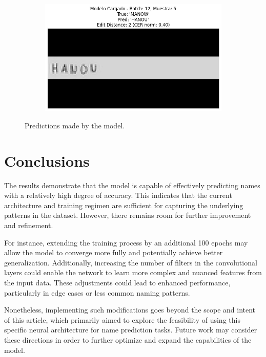 \documentclass[11pt,letterpaper]{article}
\begin{document}
\begin{figure}[!h]
\begin{subfigure}[b]{0.45\linewidth}
		\end{subfigure}	
		\begin{subfigure}[b]{0.45\linewidth}
			\centering
			\includegraphics[width=\linewidth]{pred4.jpg}
		\end{subfigure}	
		\caption{Predictions made by the model.}
		\label{fig:model_pred}
	\end{figure}
	
	\section{Conclusions}
	
	The results demonstrate that the model is capable of effectively predicting names with a relatively high degree of accuracy. This indicates that the current architecture and training regimen are sufficient for capturing the underlying patterns in the dataset. However, there remains room for further improvement and refinement.
	
	For instance, extending the training process by an additional 100 epochs may allow the model to converge more fully and potentially achieve better generalization. Additionally, increasing the number of filters in the convolutional layers could enable the network to learn more complex and nuanced features from the input data. These adjustments could lead to enhanced performance, particularly in edge cases or less common naming patterns.
	
	Nonetheless, implementing such modifications goes beyond the scope and intent of this article, which primarily aimed to explore the feasibility of using this specific neural architecture for name prediction tasks. Future work may consider these directions in order to further optimize and expand the capabilities of the model.
	
	\bigskip
	
	
	
	
\end{document}
